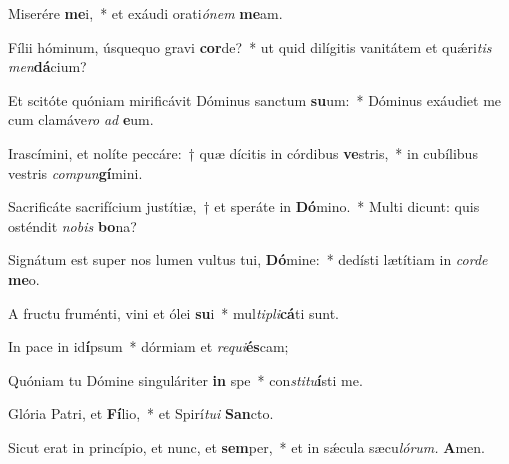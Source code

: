 \item Miserére \textbf{me}i,~* et exáudi orati\textit{ónem} \textbf{me}am.
\item Fílii hóminum, úsquequo gravi \textbf{cor}de?~* ut quid dilígitis vanitátem et quǽri\hspace{0.02em}\textit{tis} \textit{men}\textbf{dá}cium?
\item Et scitóte quóniam mirificávit Dóminus sanctum \textbf{su}um:~* Dóminus exáudiet me cum clamáve\teenyhspace\textit{ro} \textit{ad} \textbf{e}um.
\item Irascímini, et nolíte peccáre:~† quæ dícitis in córdibus \textbf{ve}stris,~* in cubílibus vestris \textit{compun}\textbf{gí}mini.
\item Sacrificáte sacrifícium justítiæ,~† et speráte in \textbf{Dó}mino.~* Multi dicunt: quis osténdit \textit{nobis} \textbf{bo}na?
\item Signátum est super nos lumen vultus tui, \textbf{Dó}mine:~* dedísti lætítiam in \textit{corde} \textbf{me}o.
\item A fructu fruménti, vini et ólei \textbf{su}i~* mul\textit{tipli}\textbf{cá}ti sunt.
\item In pace in id\textbf{í}psum~* dórmiam et \textit{requi}\textbf{és}cam;
\item Quóniam tu Dómine singuláriter \textbf{in} spe~* con\tinyhspace\textit{stitu}\textbf{í}sti me.
\item Glória Patri, et \textbf{Fí}lio,~* et Spirí\tinyhspace\textit{tui} \textbf{San}cto.
\item Sicut erat in princípio, et nunc, et \textbf{sem}per,~* et in sǽcula sæcu\tinyhspace\textit{lórum.} \textbf{A}men.